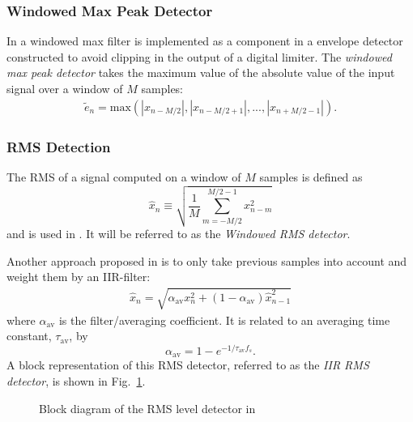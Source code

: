 \documentclass[../main2.tex]{subfiles}
\providecommand{\rootdir}{..}
\begin{document}
\subsubsection{Windowed Max Peak Detector}
In \cite{hamalainen2002smoothing} a windowed max filter is implemented as a component in a envelope detector constructed to avoid clipping in the output of a digital limiter. The \emph{windowed max peak detector} takes the maximum value of the absolute value of the input signal over a window of $M$ samples:
\begin{align}\label{eq:window_max_det}
\tilde{e}_n = \text{max}(|x_{n-M/2}|,|x_{n-M/2+1}|,..., |x_{n+M/2-1}|).
\end{align}

\subsubsection{RMS Detection}
The RMS of a signal computed on a window of $M$ samples is defined as
\begin{equation}
\hat{x}_n \equiv \sqrt{ \frac{1}{M} \sum_{m=-M/2}^{M/2-1} x_{n-m}^2}
\end{equation}
and is used in \cite{reiss2010rev, bosi1991low}. It will be referred to as the \emph{Windowed RMS detector}.

Another approach proposed in \cite{mcnally1984dynamic} is to only take previous samples into account and weight them by an IIR-filter:
\begin{align*}
\hat{x}_n = \sqrt{\alpha_{\text{av}} x_{n}^2+ (1-\alpha_{\text{av}}) \hat{x}_{n-1}^2}
\end{align*}
where $\alpha_\text{av}$ is the filter/averaging coefficient. It is related to an averaging time constant, $\tau_\text{av}$, by 
\begin{equation}
\alpha_\text{av} = 1 - e^{-1/\tau_\text{av} f_s } \label{eq:average_coeff_def}.
\end{equation}
A block representation of this RMS detector, referred to as the \emph{IIR RMS detector}, is shown in Fig.~\ref{fig:block_mcnally_theory_rms}.
\begin{figure}[h]
\centerline{}
\caption{Block diagram of the RMS level detector in \cite{mcnally1984dynamic}}
\label{fig:block_mcnally_theory_rms}
\end{figure}
\end{document}
